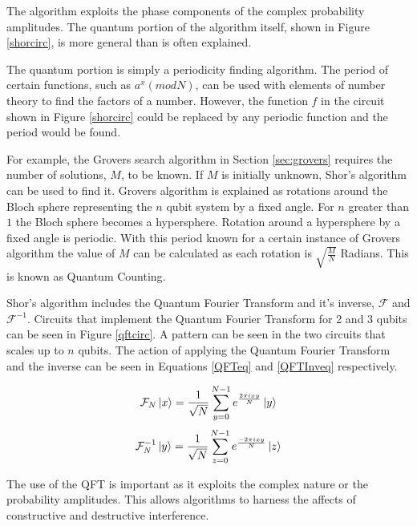 The algorithm exploits the phase components of the complex probability amplitudes.
The quantum portion of the algorithm itself, shown in Figure \ref{shorcirc}, is more general than is often explained.

The quantum portion is simply a periodicity finding algorithm.
The period of certain functions, such as $a^x(mod N)$, can be used with elements of number theory to find the factors of a number.
However, the function $f$ in the circuit shown in Figure \ref{shorcirc} could be replaced by any periodic function and the period would be found.

For example, the Grovers search algorithm in Section \ref{sec:grovers} requires the number of solutions, $M$, to be known.
If $M$ is initially unknown, Shor's algorithm can be used to find it.
Grovers algorithm is explained as rotations around the Bloch sphere representing the $n$ qubit system by a fixed angle.
For $n$ greater than $1$ the Bloch sphere becomes a hypersphere.
Rotation around a hypersphere by a fixed angle is periodic. 
With this period known for a certain instance of Grovers algorithm the value of $M$ can be calculated as each rotation is $\sqrt{\frac{M}{N}}$ Radians.
This is known as Quantum Counting\cite{Brassard:1998vj}.

Shor's algorithm includes the Quantum Fourier Transform and it's inverse, $\mathcal{F}$ and $\mathcal{F}^{-1}$.
Circuits that implement the Quantum Fourier Transform for 2 and 3 qubits can be seen in Figure \ref{qftcirc}.
A pattern can be seen in the two circuits that scales up to $n$ qubits.
The action of applying the Quantum Fourier Transform and the inverse can be seen in Equations \ref{QFTeq} and \ref{QFTInveq} respectively.

\begin{equation}
 \mathcal{F}_N\left\vert{x}\right\rangle=\frac{1}{\sqrt{N}}\sum_{y=0}^{N-1}e^{\frac{2\pi{i}xy}{N}}\left\vert{y}\right\rangle
\label{QFTeq}
\end{equation}
\begin{equation}
 \mathcal{F}^{-1}_N\left\vert{y}\right\rangle=\frac{1}{\sqrt{N}}\sum_{z=0}^{N-1}e^{\frac{-2\pi{i}xy}{N}}\left\vert{z}\right\rangle
\label{QFTInveq}
\end{equation}

The use of the QFT is important as it exploits the complex nature or the probability amplitudes.
This allows algorithms to harness the affects of constructive and destructive interference.


